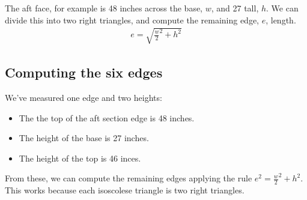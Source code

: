 \documentclass[letterpaper,10pt,english]{sphinxmanual}
\begin{document}
\sphinxAtStartPar
The aft face, for example is 48 inches across the base, \(w\), and 27 tall, \(h\). We can divide this into two right triangles, and compute the remaining edge, \(e\), length.
\begin{equation*}
\begin{split}
e = \sqrt{{\tfrac{w}{2}}^2 + h^2}
\end{split}
\end{equation*}

\subsection{Computing the six edges}
\label{\detokenize{tetrahedron:computing-the-six-edges}}
\sphinxAtStartPar
We’ve measured one edge and two heights:
\begin{itemize}
\item {} 
\sphinxAtStartPar
The the top of the aft section edge is 48 inches.

\item {} 
\sphinxAtStartPar
The height of the base is 27 inches.

\item {} 
\sphinxAtStartPar
The height of the top is 46 inces.

\end{itemize}

\sphinxAtStartPar
From these, we can compute the remaining edges applying the rule \(e^2 = {\frac{w}{2}}^2 + h^2\). This works because each isoscolese triangle is two right triangles.

\begin{sphinxVerbatim}[commandchars=\\\{\}]
   
       
\end{sphinxVerbatim}

\begin{sphinxVerbatim}[commandchars=\\\{\}]
  

     
  
\end{sphinxVerbatim}
\end{document}
